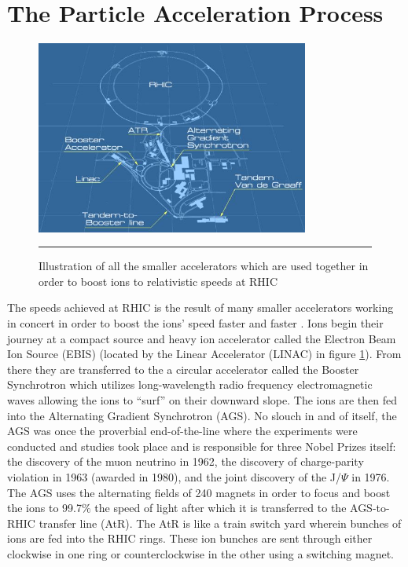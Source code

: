 \section{The Particle Acceleration Process}
\begin{figure}[htbp]
  \centering
    \includegraphics[width=0.8\textwidth]{Figures/RHICdiagram.JPG}
    \rule{35em}{0.5pt}
  \caption[Illustration of all the accelerators used to boost ions to relativistic speeds at RHIC]{Illustration of all the smaller accelerators which are used together in order to boost ions to relativistic speeds at RHIC}
  \label{fig:RHICdiagram}
\end{figure}
The speeds achieved at RHIC is the result of many smaller accelerators working in concert in order to boost the ions' speed faster and faster \citep{RHICaccel}.  Ions begin their journey at a compact source and heavy ion accelerator called the Electron Beam Ion Source (EBIS) (located by the Linear Accelerator (LINAC) in figure \ref{fig:RHICdiagram}). From there they are transferred to the a circular accelerator called the Booster Synchrotron which utilizes long-wavelength radio frequency electromagnetic waves allowing the ions to ``surf'' on their downward slope. The ions are then fed into the Alternating Gradient Synchrotron (AGS). No slouch in and of itself, the AGS was once the proverbial end-of-the-line where the experiments were conducted and studies took place and is responsible for three Nobel Prizes itself: the discovery of the muon neutrino in 1962, the discovery of charge-parity violation in 1963 (awarded in 1980), and the joint discovery of the J/$\Psi$ in 1976. The AGS uses the alternating fields of 240 magnets in order to focus and boost the ions to 99.7$\%$ the speed of light after which it is transferred to the AGS-to-RHIC transfer line (AtR). The AtR is like a train switch yard wherein bunches of ions are fed into the RHIC rings. These ion bunches are sent through either clockwise in one ring or counterclockwise in the other using a switching magnet.

